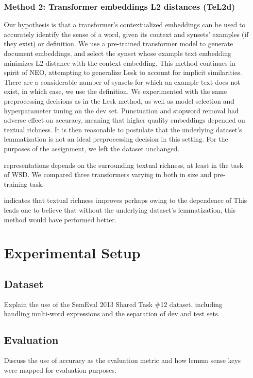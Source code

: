 \documentclass[11pt]{article}
\begin{document}
\subsubsection{Method 2: Transformer embeddings L2 distances (TeL2d)}
Our hypothesis is that a transformer's contextualized embeddings 
can be used to accurately identify the sense of a word, given its context and synsets'
examples (if they exist) or definition. We use a pre-trained transformer
model to generate document embeddings, and select the synset whose example text 
embedding minimizes L2 distance with the context embedding. 
This method continues in spirit of NEO, attempting to generalize Lesk to account for implicit similarities. 
There are a considerable number of synsets for which an example text does not exist, 
in which case, we use the definition. We experimented with the same preprocessing decisions 
as in the Lesk method, as well as model selection and hyperparameter tuning on the dev set.
Punctuation and stopword removal had adverse effect on accuracy, meaning that 
higher quality embeddings depended on textual richness. It is then reasonable 
to postulate that the underlying dataset's lemmatization is not an ideal preprocessing decision
in this setting. For the purposes of the assignment, we left the dataset unchanged.

representations depends on the surrounding textual richness, at least in the task of WSD. 
We compared three transformers varying in both in size and pre-training task.

indicates that textual richness improves perhaps owing to the dependence of
This leads one to believe that without the underlying dataset's lemmatization, this method would have performed better. 
\section{Experimental Setup}
\subsection{Dataset}
Explain the use of the SemEval 2013 Shared Task \#12 dataset, including handling multi-word expressions and the separation of dev and test sets.

\subsection{Evaluation}
Discuss the use of accuracy as the evaluation metric and how lemma sense keys were mapped for evaluation purposes.
\end{document}
